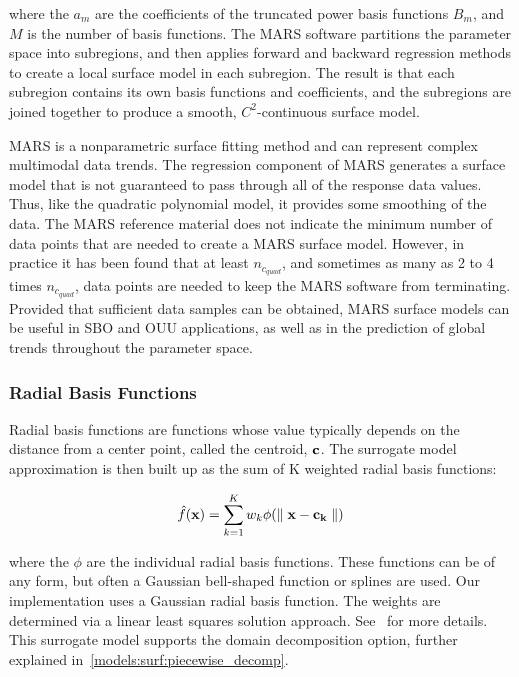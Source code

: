 where the $a_{m}$ are the coefficients of the truncated power basis
functions $B_{m}$, and $M$ is the number of basis functions. The MARS
software partitions the parameter space into subregions, and then
applies forward and backward regression methods to create a local
surface model in each subregion. The result is that each subregion
contains its own basis functions and coefficients, and the subregions
are joined together to produce a smooth, $C^{2}$-continuous surface
model.

MARS is a nonparametric surface fitting method and can represent
complex multimodal data trends. The regression component of MARS
generates a surface model that is not guaranteed to pass through all
of the response data values. Thus, like the quadratic polynomial
model, it provides some smoothing of the data. The MARS reference
material does not indicate the minimum number of data points that are
needed to create a MARS surface model. However, in practice it has
been found that at least $n_{c_{quad}}$, and sometimes as many as 2 to
4 times $n_{c_{quad}}$, data points are needed to keep the MARS
software from terminating.  Provided that sufficient data samples can
be obtained, MARS surface models can be useful in SBO and OUU
applications, as well as in the prediction of global trends throughout
the parameter space.

\subsubsection{Radial Basis Functions}\label{models:surf:rbf}

Radial basis functions are functions whose value typically depends on the 
distance from a center point, called the centroid, ${\bf c}$. 
The surrogate model approximation is then built up as the sum of K 
weighted radial basis functions: 

\begin{equation}
  \hat{f}({\bf x})=\sum_{k=1}^{K}w_{k}\phi({\parallel {\bf x} - {\bf c_{k}} \parallel})
  \label{models:surf:equation11}  
\end{equation}

where the $\phi$ are the individual radial basis functions.  
These functions can be of any form, but often a Gaussian bell-shaped 
function or splines are used.  
Our implementation uses a Gaussian radial basis function. 
The weights are determined via a linear least squares solution approach.
See~\cite{Orr96} for more details.
This surrogate model supports the domain decomposition option, further explained in~\ref{models:surf:piecewise_decomp}.

